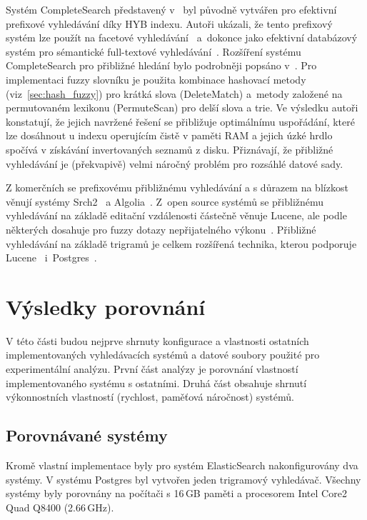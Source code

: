 \documentclass[11pt,letterpaper,oneside,openright]{book}
\begin{document}
Systém CompleteSearch představený v~\cite{Bast:2006:TLF:1148170.1148234} byl
původně vytvářen pro efektivní prefixové vyhledávání díky HYB indexu. Autoři
ukázali, že tento prefixový systém lze použít na facetové
vyhledávání~\cite{Bast_abstractwhen} a~dokonce jako efektivní databázový systém
pro sémantické full-textové vyhledávání~\cite{Bast:2007:EES:1277741.1277856}.
Rozšíření systému CompleteSearch pro přibližné hledání bylo podrobněji popsáno
v~\cite{Bast:2013:EFS:2457465.2457470}. Pro implementaci fuzzy slovníku je
použita kombinace hashovací metody (viz~\ref{sec:hash_fuzzy}) pro krátká slova
(DeleteMatch) a~metody založené na permutovaném lexikonu (PermuteScan) pro
delší slova a trie. Ve výsledku autoři konstatují, že jejich navržené řešení se
přibližuje optimálnímu uspořádání, které lze dosáhnout u indexu operujícím
čistě v paměti RAM a jejich úzké hrdlo spočívá v získávání invertovaných
seznamů z disku. Přiznávají, že přibližné vyhledávání je (překvapivě) velmi
náročný problém pro rozsáhlé datové sady.

Z komerčních se prefixovému přibližnému vyhledávání a s důrazem na blízkost
věnují systémy Srch2~\cite{srch2_website} a Algolia~\cite{algolia_website}.
Z~open source systémů se přibližnému vyhledávání na základě editační
vzdálenosti částečně věnuje Lucene, ale podle některých dosahuje pro fuzzy
dotazy nepřijatelného
výkonu~\cite{Bast:2013:EFS:2457465.2457470,algolia_vs_elasticsearch}. Přibližné
vyhledávání na základě trigramů je celkem rozšířená technika, kterou podporuje
Lucene~\cite{lucene_website} i~Postgres~\cite{postgres_website}.


\chapter{Výsledky porovnání} \label{sec:results}
V této části budou nejprve shrnuty konfigurace a vlastnosti ostatních
implementovaných vyhledávacích systémů a datové soubory použité pro
experimentální analýzu.  První část analýzy je porovnání vlastností
implementovaného systému s ostatními. Druhá část obsahuje shrnutí výkonnostních
vlastností (rychlost, paměťová náročnost) systémů.

\section{Porovnávané systémy}
Kromě vlastní implementace byly pro systém ElasticSearch nakonfigurovány
dva systémy. V systému Postgres byl vytvořen jeden trigramový
vyhledávač. Všechny systémy byly porovnány na počítači s 16\,GB paměti a
procesorem Intel Core2 Quad Q8400 (2.66\,GHz).
\end{document}
